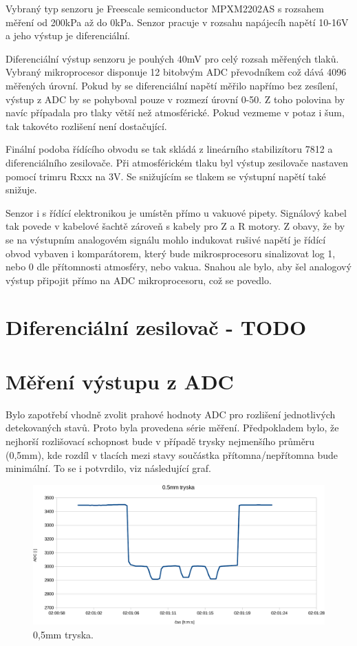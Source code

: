 Vybraný typ senzoru je Freescale semiconductor MPXM2202AS s rozsahem měření od 200kPa až do 0kPa.  Senzor pracuje v rozsahu napájecíh napětí 10-16V a jeho výstup je diferenciální.

Diferenciální výstup senzoru je pouhých 40mV pro celý rozsah měřených tlaků. Vybraný mikroprocesor disponuje 12 bitobvým ADC převodníkem což dává  4096 měřených úrovní. Pokud by se diferenciální napětí měřilo napřímo bez zesílení, výstup z ADC by se pohyboval pouze v rozmezí úrovní 0-50. Z toho polovina by navíc případala pro tlaky větší než atmosférické. Pokud vezmeme v potaz i šum, tak takovéto rozlišení není dostačující.

Finální podoba  řídícího obvodu se tak skládá z lineárního stabilizítoru 7812 a diferenciálního zesilovače. Při atmosférickém tlaku byl výstup zesilovače nastaven pomocí trimru Rxxx na 3V. Se snižujícím se tlakem se výstupní napětí také snižuje.

 Senzor i s řídící elektronikou je umístěn přímo u vakuové pipety. Signálový kabel tak povede v kabelové šachtě zároveň s kabely pro Z a R motory. Z obavy, že by se na výstupním analogovém signálu mohlo indukovat rušivé napětí je řídící obvod vybaven i komparátorem, který bude mikrosprocesoru sinalizovat log 1, nebo 0 dle přítomnosti atmosféry, nebo vakua. Snahou ale bylo, aby šel analogový výstup připojit přímo na ADC mikroprocesoru, což se povedlo.


\section{Diferenciální zesilovač - TODO}

\section{Měření výstupu z ADC}
Bylo zapotřebí vhodně zvolit prahové hodnoty ADC pro rozlišení jednotlivých detekovaných stavů. Proto byla provedena série měření. Předpokladem bylo, že nejhorší rozlišovací schopnost bude v případě trysky nejmenšího průměru (0,5mm), kde rozdíl v tlacích mezi stavy součástka přítomna/nepřítomna bude minimální. To se i potvrdilo, viz následující graf.

\begin{figure}[h!]
  \centering
    \includegraphics[width=0.9\linewidth]{pdf/5mm-crop2.pdf}%
    \caption{0,5mm tryska.}
    \label{fig:sensor}
\end{figure}

